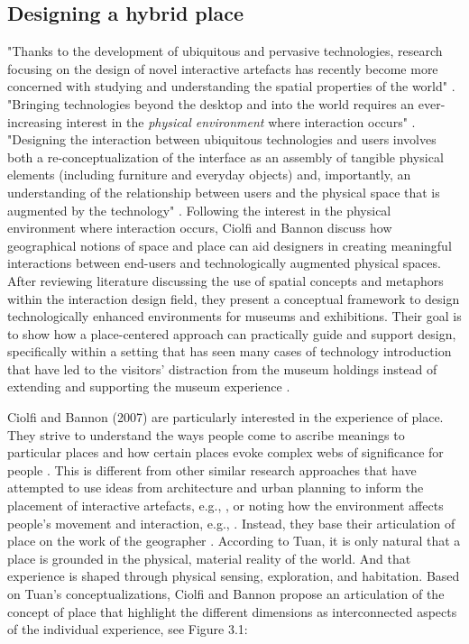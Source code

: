 \subsection{Designing a hybrid place}
"Thanks to the development of ubiquitous and pervasive technologies, research focusing on the design of novel interactive artefacts has recently become more concerned with studying and understanding the spatial properties of the world" \autocite[p. 159]{hybridplace_ciolfi}. "Bringing technologies beyond the desktop and into the world requires an ever-increasing interest in the \emph{physical environment} where interaction occurs" \autocite[p. 159]{hybridplace_ciolfi}. "Designing the interaction between ubiquitous technologies and users involves both a re-conceptualization of the interface as an assembly of tangible physical elements (including furniture and everyday objects) and, importantly, an understanding of the relationship between users and the physical space that is augmented by the technology" \autocite[p. 159]{hybridplace_ciolfi}. Following the interest in the physical environment where interaction occurs, Ciolfi and Bannon discuss how geographical notions of space and place can aid designers in creating meaningful interactions between end-users and technologically augmented physical spaces. After reviewing literature discussing the use of spatial concepts and metaphors within the interaction design field, they present a conceptual framework to design technologically enhanced environments for museums and exhibitions. Their goal is to show how a place-centered approach can practically guide and support design, specifically within a setting that has seen many cases of technology introduction that have led to the visitors' distraction from the museum holdings instead of extending and supporting the museum experience \autocite[p. 159-160]{hybridplace_ciolfi}.


Ciolfi and Bannon (2007) are particularly interested in the experience of place. They strive to understand the ways people come to ascribe meanings to particular places and how certain places evoke complex webs of significance for people \autocite[p. 160]{hybridplace_ciolfi}. This is different from other similar research approaches that have attempted to use ideas from architecture and urban planning to inform the placement of interactive artefacts, e.g., \autocite{Cullen_book}, or noting how the environment affects people's movement and interaction, e.g., \autocite{Alexander_book}. Instead, they base their articulation of place on the work of the geographer \autocite{Tuan_book}. According to Tuan, it is only natural that a place is grounded in the physical, material reality of the world. And that experience is shaped through physical sensing, exploration, and habitation. Based on Tuan's conceptualizations, Ciolfi and Bannon propose an articulation of the concept of place that highlight the different dimensions as interconnected aspects of the individual experience, see Figure 3.1:

